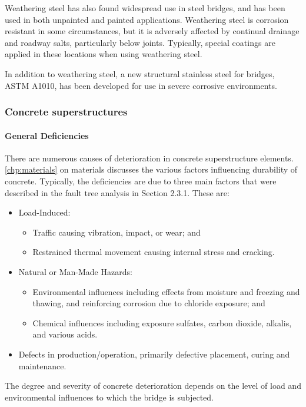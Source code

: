 Weathering steel has also found widespread use in steel bridges, and has been used in both unpainted and painted
applications. Weathering steel is corrosion resistant in some circumstances, but it is adversely affected by continual
drainage and roadway salts, particularly below joints. Typically, special coatings are applied in these locations when
using weathering steel.

In addition to weathering steel, a new structural stainless steel for bridges, ASTM A1010, has been developed for
use in severe corrosive environments.

\subsubsection{Concrete superstructures}
\paragraph{General Deficiencies}
There are numerous causes of deterioration in concrete superstructure elements. \cref{chp:materials} on materials discusses
the various factors influencing durability of concrete. Typically, the deficiencies are due to three main factors that
were described in the fault tree analysis in Section 2.3.1. These are:
\begin{itemize}
  \item Load-Induced:
  \begin{itemize}
    \item Traffic causing vibration, impact, or wear; and
    \item Restrained thermal movement causing internal stress and cracking.
  \end{itemize}
  \item Natural or Man-Made Hazards:
  \begin{itemize}
    \item Environmental influences including effects from moisture and freezing and thawing, and reinforcing
    corrosion due to chloride exposure; and
    \item Chemical influences including exposure sulfates, carbon dioxide, alkalis, and various acids.
  \end{itemize}
  \item Defects in production/operation, primarily defective placement, curing and maintenance.
\end{itemize}
The degree and severity of concrete deterioration depends on the level of load and environmental influences to which the bridge is subjected.

